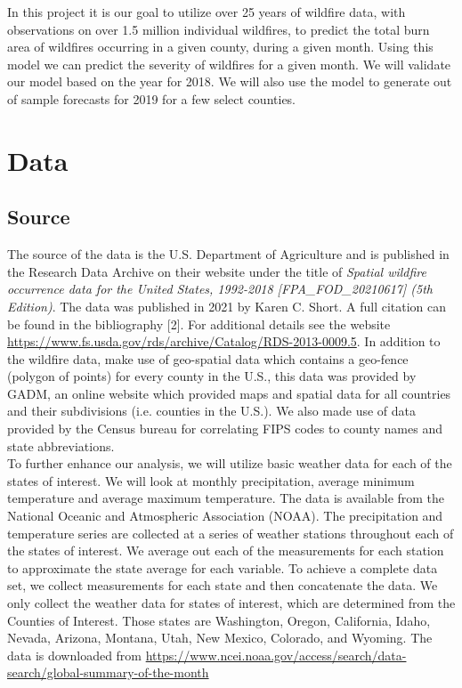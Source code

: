 \documentclass[12pt]{article}
\begin{document}
In this project it is our goal to utilize over 25 years of wildfire data, with observations on over 1.5 million individual wildfires, to predict the total burn area of wildfires occurring in a given county, during a given month. Using this model we can predict the severity of wildfires for a given month. We will validate our model based on the year for 2018. We will also use the model to generate out of sample forecasts for 2019 for a few select counties. 

\section{\textrm{ \LARGE Data}} 

\subsection{\textrm{Source}}

The source of the data is the U.S. Department of Agriculture and is published in the Research Data Archive on their website under the title of \textit{Spatial wildfire occurrence data for the United States, 1992-2018 [FPA\_FOD\_20210617] (5th Edition)}. The data was published in 2021 by Karen C. Short. A full citation can be found in the bibliography [2]. For additional details see the website \url{https://www.fs.usda.gov/rds/archive/Catalog/RDS-2013-0009.5}. In addition to the wildfire data, make use of geo-spatial data which contains a geo-fence (polygon of points) for every county in the U.S., this data was provided by GADM, an online website which provided maps and spatial data for all countries and their subdivisions (i.e. counties in the U.S.). We also made use of data provided by the Census bureau for correlating FIPS codes to county names and state abbreviations. \\

To further enhance our analysis, we will utilize basic weather data for each of the states of interest. We will look at monthly precipitation, average minimum temperature and average maximum temperature. The data is available from the National Oceanic and Atmospheric Association (NOAA). The precipitation and temperature series are collected at a series of weather stations throughout each of the states of interest. We average out each of the measurements for each station to approximate the state average for each variable. To achieve a complete data set, we collect measurements for each state and then concatenate the data. We only collect the weather data for states of interest, which are determined from the Counties of Interest. Those states are Washington, Oregon, California, Idaho, Nevada, Arizona, Montana, Utah, New Mexico, Colorado, and Wyoming. The data is downloaded from \url{https://www.ncei.noaa.gov/access/search/data-search/global-summary-of-the-month}
\end{document}
